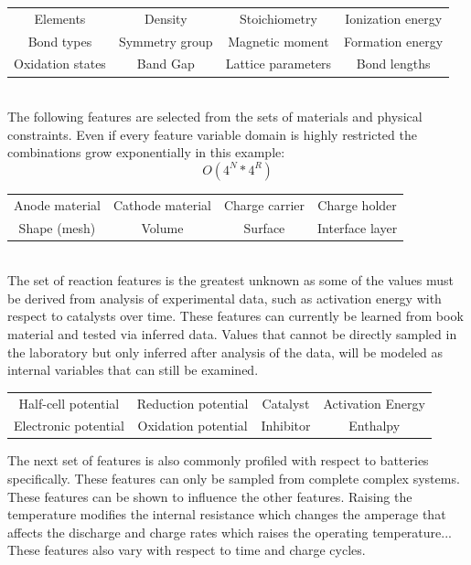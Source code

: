 \documentclass{article}
\begin{document}
\noindent
\begin{tabular}{|c c c c|}
	\hline
	Elements & Density & Stoichiometry & Ionization energy\\
	Bond types & Symmetry group & Magnetic moment & Formation energy\\
	Oxidation states & Band Gap & Lattice parameters & Bond lengths\\
	\hline
\end{tabular}\\

The following features are selected from the sets of materials and physical constraints. Even if every feature variable domain is highly restricted the combinations grow exponentially in this example: $$O(4^N*4^R)$$
\noindent
\begin{tabular}{| c c c c|}
	\hline
	Anode material & Cathode material & Charge carrier & Charge holder \\
	Shape (mesh) & Volume & Surface & Interface layer\\ 
	\hline
\end{tabular}\\

The set of reaction features is the greatest unknown as some of the values must be derived from analysis of experimental data, such as activation energy with respect to catalysts over time. These features can currently be learned from book material and tested via inferred data. Values that cannot be directly sampled in the laboratory but only inferred after analysis of the data, will be modeled as internal variables that can still be examined.\\

\noindent
\begin{tabular}{| c c c c|}
	\hline
	Half-cell potential & Reduction potential & Catalyst & Activation Energy \\
	Electronic potential & Oxidation potential & Inhibitor & Enthalpy \\
	\hline
\end{tabular}


The next set of features is also commonly profiled with respect to batteries specifically. These features can only be sampled from complete complex systems. These features can be shown to influence the other features. Raising the temperature modifies the internal resistance which changes the amperage that affects the discharge and charge rates which raises the operating temperature... These features also vary with respect to time and charge cycles.\\
\end{document}
